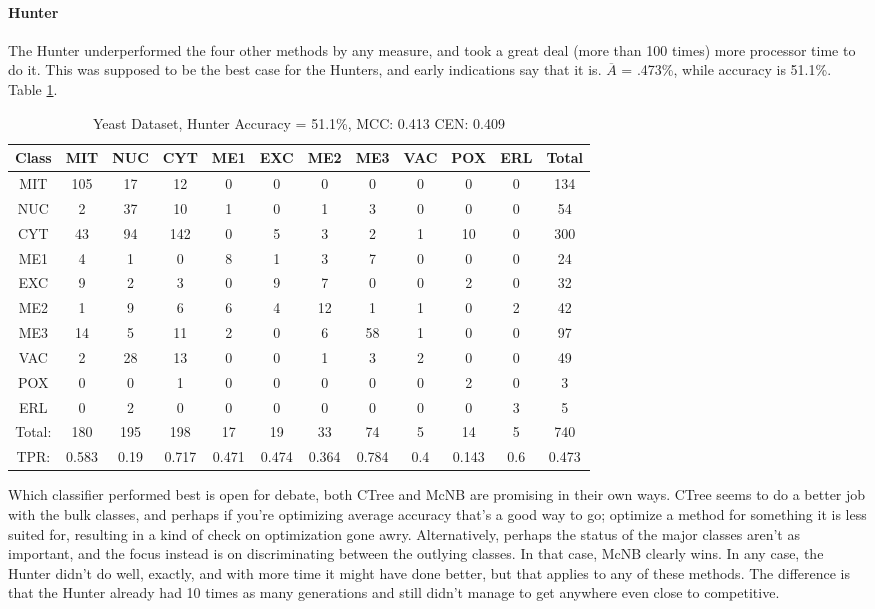 	\paragraph{Hunter}
The Hunter underperformed the four other methods by any measure, and took a great deal (more than 100 times) more processor time to do it.  This was supposed to be the best case for the Hunters, and early indications say that it is.  $\overline{A}$ = .473\%, while accuracy is 51.1\%.  Table \ref{tab:yeasthunter}.
\\
\begin{table}[h!]
		\begin{tabular}{|c|c|c|c|c|c|c|c|c|c|c|c|}
		\hline
		Class&MIT&NUC&CYT&ME1&EXC&ME2&ME3&VAC&POX&ERL&Total\\
		\hline
MIT&105&17&12&0&0&0&0&0&0&0&134\\
NUC&2&37&10&1&0&1&3&0&0&0&54\\
CYT&43&94&142&0&5&3&2&1&10&0&300\\
ME1&4&1&0&8&1&3&7&0&0&0&24\\
EXC&9&2&3&0&9&7&0&0&2&0&32\\
ME2&1&9&6&6&4&12&1&1&0&2&42\\
ME3&14&5&11&2&0&6&58&1&0&0&97\\
VAC&2&28&13&0&0&1&3&2&0&0&49\\
POX&0&0&1&0&0&0&0&0&2&0&3\\
ERL&0&2&0&0&0&0&0&0&0&3&5\\
\hline
Total:&180&195&198&17&19&33&74&5&14&5&740\\
TPR:&0.583&0.19&0.717&0.471&0.474&0.364&0.784&0.4&0.143&0.6&0.473\\

		\hline
	\end{tabular}
	\caption[Yeast: Hunter]{Yeast Dataset, Hunter Accuracy = 51.1\%, MCC: 0.413 CEN: 0.409}
	\label{tab:yeasthunter}
\end{table}

Which classifier performed best is open for debate, both CTree and McNB are promising in their own ways.  CTree seems to do a better job with the bulk classes, and perhaps if you're optimizing average accuracy that's a good way to go; optimize a method for something it is less suited for, resulting in a kind of check on optimization gone awry.  Alternatively, perhaps the status of the major classes aren't as important, and the focus instead is on discriminating between the outlying classes.  In that case, McNB clearly wins.  In any case, the Hunter didn't do well, exactly, and with more time it might have done better, but that applies to any of these methods.  The difference is that the Hunter already had 10 times as many generations and still didn't manage to get anywhere even close to competitive.

